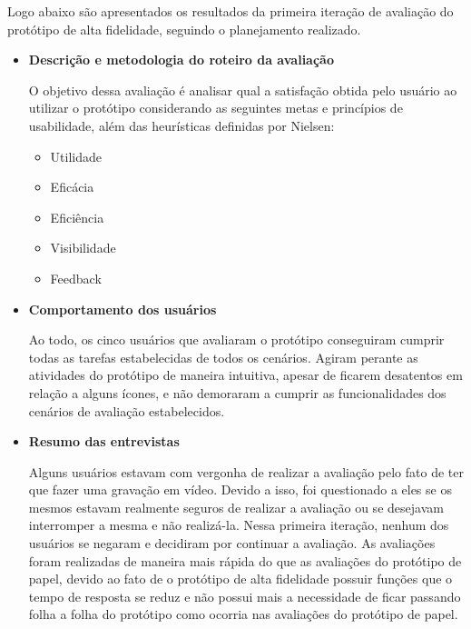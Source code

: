       Logo abaixo são apresentados os resultados da primeira iteração de avaliação do protótipo de alta fidelidade,
      seguindo o planejamento realizado.
      
      \begin{itemize}
       \item \textbf{Descrição e metodologia do roteiro da avaliação}
       
       \subitem O objetivo dessa avaliação é analisar qual a satisfação obtida pelo usuário ao utilizar o protótipo considerando as seguintes 
       metas e princípios de usabilidade, além das heurísticas definidas por Nielsen:
       \begin{itemize}

	\item Utilidade
        \item Eficácia
        \item Eficiência
        \item Visibilidade
        \item Feedback
        
       \end{itemize}
       
       \item \textbf{Comportamento dos usuários}
       
       \subitem Ao todo, os cinco usuários que avaliaram o protótipo conseguiram cumprir todas as tarefas estabelecidas 
       de todos os cenários. Agiram perante as atividades do protótipo de maneira intuitiva, apesar de ficarem 
       desatentos em relação a alguns ícones, e não demoraram a cumprir as funcionalidades dos cenários de avaliação 
       estabelecidos.
       
       \item \textbf{Resumo das entrevistas}
       
       \subitem Alguns usuários estavam com vergonha de realizar a avaliação pelo fato de ter que fazer uma gravação em vídeo. 
       Devido a isso, foi questionado a eles se os mesmos estavam realmente seguros de realizar a avaliação ou se desejavam 
       interromper a mesma e não realizá-la. Nessa primeira iteração, nenhum dos usuários se negaram e decidiram por 
       continuar a avaliação. As avaliações foram realizadas de maneira mais rápida do que as avaliações do protótipo de papel, 
       devido ao fato de o protótipo de alta fidelidade possuir funções que o tempo de resposta se reduz e não possui mais a 
       necessidade de ficar passando folha a folha do protótipo como ocorria nas avaliações do protótipo de papel.
       

\end{itemize}
